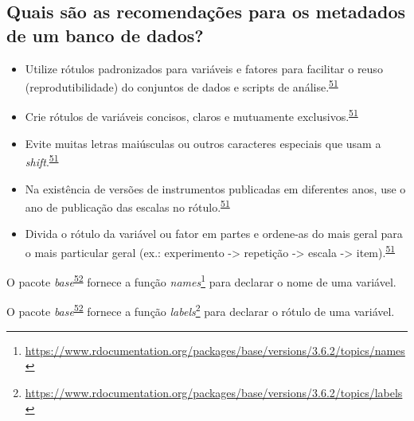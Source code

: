 \documentclass[
  a4paper,
]{book}
\renewcommand{\href}[2]{#2\footnote{\url{#1}}}
\newenvironment{infobox}[1]
  {
  \begin{itemize}
  \renewcommand{\labelitemi}{
    \raisebox{-.7\height}[0pt][0pt]{
      {\setkeys{Gin}{width=3em,keepaspectratio}
        \texttt{[image: \#1]}}
    }
  }
  \setlength{\fboxsep}{1em}
  \begin{blackbox}
  \item
  }
  {
  \end{blackbox}
  \end{itemize}
  }
\begin{document}
\hypertarget{quais-suxe3o-as-recomendauxe7uxf5es-para-os-metadados-de-um-banco-de-dados}{%
\subsection{Quais são as recomendações para os metadados de um banco de dados?}\label{quais-suxe3o-as-recomendauxe7uxf5es-para-os-metadados-de-um-banco-de-dados}}

\begin{itemize}
\item
  Utilize rótulos padronizados para variáveis e fatores para facilitar o reuso (reprodutibilidade) do conjuntos de dados e scripts de análise.\textsuperscript{\protect\hyperlink{ref-buttliere2021}{51}}
\item
  Crie rótulos de variáveis concisos, claros e mutuamente exclusivos.\textsuperscript{\protect\hyperlink{ref-buttliere2021}{51}}
\item
  Evite muitas letras maiúsculas ou outros caracteres especiais que usam a \emph{shift}.\textsuperscript{\protect\hyperlink{ref-buttliere2021}{51}}
\item
  Na existência de versões de instrumentos publicadas em diferentes anos, use o ano de publicação das escalas no rótulo.\textsuperscript{\protect\hyperlink{ref-buttliere2021}{51}}
\item
  Divida o rótulo da variável ou fator em partes e ordene-as do mais geral para o mais particular geral (ex.: experimento -\textgreater{} repetição -\textgreater{} escala -\textgreater{} item).\textsuperscript{\protect\hyperlink{ref-buttliere2021}{51}}
\end{itemize}

\begin{infobox}{images/Rlogo}
O pacote \emph{base}\textsuperscript{\protect\hyperlink{ref-base-3}{52}} fornece a função \href{https://www.rdocumentation.org/packages/base/versions/3.6.2/topics/names}{\emph{names}} para declarar o nome de uma variável.

\end{infobox}

\begin{infobox}{images/Rlogo}
O pacote \emph{base}\textsuperscript{\protect\hyperlink{ref-base-3}{52}} fornece a função \href{https://www.rdocumentation.org/packages/base/versions/3.6.2/topics/labels}{\emph{labels}} para declarar o rótulo de uma variável.

\end{infobox}
\end{document}
